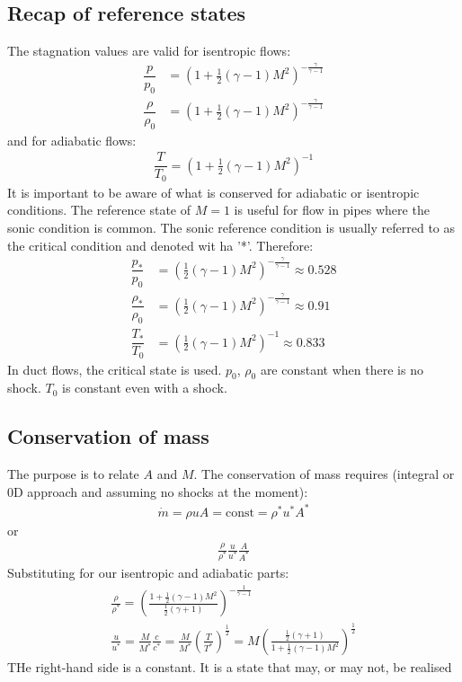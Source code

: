 \documentclass[class=report, crop=false, 12pt,a4paper]{standalone}
\begin{document}
\subsection{Recap of reference states}
The stagnation values are valid for isentropic flows:
\begin{align}
    \dfrac{p}{p_0}       & = \left(1 + \frac{1}{2}\left(\gamma - 1\right)M^2\right)^{-\frac{\gamma}{\gamma - 1}} \\
    \dfrac{\rho}{\rho_0} & = \left(1 + \frac{1}{2}\left(\gamma - 1\right)M^2\right)^{-\frac{\gamma}{\gamma - 1}}
\end{align}
and for adiabatic flows:
\begin{gather}
    \dfrac{T}{T_0} = \left(1 + \frac{1}{2}\left(\gamma - 1\right)M^2\right)^{-1}
\end{gather}
It is important to be aware of what is conserved for adiabatic or isentropic conditions. The reference state of $M = 1$ is useful for flow in pipes where the sonic condition is common. The sonic reference condition is usually referred to as the critical condition and denoted wit ha '*'. Therefore:
\begin{align}
    \dfrac{p_*}{p_0}       & = \left(\frac{1}{2}\left(\gamma - 1\right)M^2\right)^{-\frac{\gamma}{\gamma - 1}} \approx 0.528 \\
    \dfrac{\rho_*}{\rho_0} & = \left(\frac{1}{2}\left(\gamma - 1\right)M^2\right)^{-\frac{\gamma}{\gamma - 1}}  \approx 0.91 \\
    \dfrac{T_*}{T_0}       & = \left(\frac{1}{2}\left(\gamma - 1\right)M^2\right)^{-1} \approx 0.833
\end{align}
In duct flows, the critical state is used. $p_0$, $\rho_0$ are constant when there is no shock. $T_0$ is constant even with a shock.
\subsection{Conservation of mass}
The purpose is to relate $A$ and $M$. The conservation of mass requires (integral or 0D approach and assuming no shocks at the moment):
\begin{gather}
    \dot{m} = \rho u A = \textrm{const} = \rho^* u^* A^*
\end{gather}
or
\begin{gather}
    \frac{\rho}{\rho^*} \frac{u}{u^*} \frac{A}{A^*}
\end{gather}
Substituting for our isentropic and adiabatic parts:
\begin{gather}
    \frac{\rho}{\rho^*} = \left(\frac{1 + \frac{1}{2}\left(\gamma - 1\right)M^2}{\frac{1}{2}\left(\gamma + 1 \right)}\right)^{-\frac{1}{\gamma - 1}}\\
    \frac{u}{u^*} = \frac{M}{M^*} \frac{c}{c^*} = \frac{M}{M^*}\left(\frac{T}{T^*}\right)^{\frac{1}{2}} = M \left(\frac{\frac{1}{2}\left(\gamma + 1\right)}{1 + \frac{1}{2}\left(\gamma - 1\right)M^2}\right)^{\frac{1}{2}}
\end{gather}
THe right-hand side is a constant. It is a state that may, or may not, be realised
\end{document}
